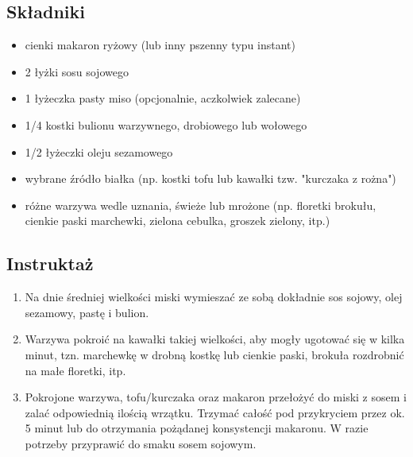 \documentclass[a4paper,10pt]{book}
\begin{document}
\begin{multicols}{2}

\subsection*{Składniki} \begin{itemize} 
\item cienki makaron ryżowy (lub inny pszenny typu instant) 
\item 2 łyżki sosu sojowego 
\item 1 łyżeczka pasty miso (opcjonalnie, aczkolwiek zalecane) 
\item 1/4 kostki bulionu warzywnego, drobiowego lub wołowego
\item 1/2 łyżeczki oleju sezamowego 
\item wybrane źródło białka (np. kostki tofu lub kawałki tzw. "kurczaka z rożna")
\item różne warzywa wedle uznania, świeże lub mrożone (np. floretki brokułu, cienkie paski marchewki, zielona cebulka, groszek zielony, itp.) 
\end{itemize}

\columnbreak

\begin{figure}[H]
    \centering
\end{figure}
\end{multicols}

\vspace{0.5cm} 

\subsection*{Instruktaż} 
\begin{enumerate} 
    \item Na dnie średniej wielkości miski wymieszać ze sobą dokładnie sos sojowy, olej sezamowy, pastę i bulion. 
    \item Warzywa pokroić na kawałki takiej wielkości, aby mogły ugotować się w kilka minut, tzn. marchewkę w drobną kostkę lub cienkie paski, brokuła rozdrobnić na małe floretki, itp. 
    \item Pokrojone warzywa, tofu/kurczaka oraz makaron przełożyć do miski z sosem i zalać odpowiednią ilością wrzątku. Trzymać całość pod przykryciem przez ok. 5 minut lub do otrzymania pożądanej konsystencji makaronu. W razie potrzeby przyprawić do smaku sosem sojowym. 
\end{enumerate}
\end{document}
